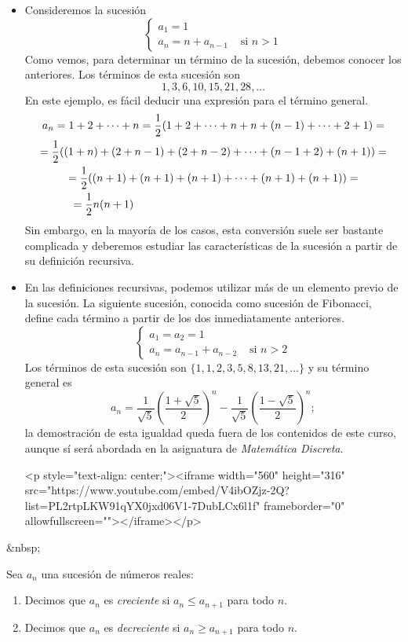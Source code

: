 \begin{ejemplo-br}
\begin{itemize}
\item
Consideremos la sucesión
\[
\begin{cases}
a_1=1 & \\
a_n=n+a_{n-1} & \mbox{ si } n>1
\end{cases}
\]
Como vemos, para determinar un término de la sucesión, debemos conocer los anteriores.
Los términos de esta sucesión son
\[
1,3,6,10,15,21,28,\dots
\]
En este ejemplo, es fácil deducir una expresión para el término general.
\begin{multline}
a_n=1+2+\dots+n=\frac12(1+2+\dots+n+n+(n-1)+\dots+2+1)= \\
= \frac12((1+n)+(2+n-1)+(2+n-2)+\dots+(n-1+2)+(n+1)) = \\
= \frac12((n+1)+(n+1)+(n+1)+\dots+(n+1)+(n+1)) = \\
= \frac12n(n+1)\rule{20em}{0pt}
\end{multline}
Sin embargo, en la mayoría de los casos, esta conversión suele ser bastante complicada y deberemos estudiar las características de la sucesión a partir de su definición recursiva.

\item
En las definiciones recursivas, podemos utilizar más de un elemento previo de la sucesión.
La siguiente sucesión, conocida como sucesión de Fibonacci, define cada término a partir de los dos inmediatamente anteriores.
\[
\begin{cases}
a_1=a_2=1 & \\
a_n=a_{n-1}+a_{n-2} & \mbox{ si } n>2
\end{cases}
\]
Los términos de esta sucesión son $\{1,1,2,3,5,8,13,21,\dots\}$ y su término general es
\[
a_n = \frac{1}{\sqrt{5}}\left(\frac{1+\sqrt{5}}{2}\right)^n - \frac{1}{\sqrt{5}}\left(\frac{1-\sqrt{5}}{2}\right)^n;
\]
la demostración de esta igualdad queda fuera de los contenidos de este curso, aunque sí será abordada en la asignatura de \emph{Matemática Discreta}.

\begin{rawhtml}
<p style="text-align: center;"><iframe width="560" height="316" src="https://www.youtube.com/embed/V4ibOZjz-2Q?list=PL2rtpLKW91qYX0jxd06V1-7DubLCx6l1f" frameborder="0" allowfullscreen=""></iframe></p>
\end{rawhtml}

\end{itemize}
\end{ejemplo-br}
\begin{rawhtml}
&nbsp;
\end{rawhtml}
\begin{definicion} Sea $a_n$ una sucesión de números reales:
\begin{enumerate}
\item
Decimos que $a_n$ es \emph{creciente} si $a_n\leq a_{n+1}$ para todo $n$.
\item
Decimos que $a_n$ es \emph{decreciente} si $a_n\geq a_{n+1}$ para todo $n$.
\end{enumerate}
\end{definicion}

